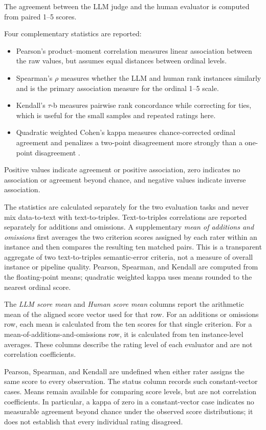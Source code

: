 The agreement between the LLM judge and the human evaluator is computed from
paired 1--5 scores.

Four complementary statistics are reported:
\begin{itemize}
  \item Pearson's product--moment correlation measures linear association
  between the raw values, but assumes equal distances between ordinal levels.
  \item Spearman's $\rho$ measures whether the LLM and human rank instances
  similarly and is the primary association measure for the ordinal 1--5 scale.
  \item Kendall's $\tau$-b measures pairwise rank concordance while correcting
  for ties, which is useful for the small samples and repeated ratings here.
  \item Quadratic weighted Cohen's kappa measures chance-corrected ordinal
  agreement and penalizes a two-point disagreement more strongly than a
  one-point disagreement \cite{cohen1960agreement}.
\end{itemize}
Positive values indicate agreement or positive association, zero indicates no
association or agreement beyond chance, and negative values indicate inverse
association.

The statistics are calculated separately for the two evaluation tasks and never
mix data-to-text with text-to-triples. Text-to-triples correlations are reported
separately for additions and omissions. A supplementary \emph{mean of additions
and omissions} first averages the two criterion scores assigned by each rater
within an instance and then compares the resulting ten matched pairs. This is a
transparent aggregate of two text-to-triples semantic-error criteria, not a
measure of overall instance or pipeline quality. Pearson, Spearman, and Kendall
are computed from the floating-point means; quadratic weighted kappa uses means
rounded to the nearest ordinal score.

The \emph{LLM score mean} and \emph{Human score mean} columns report the
arithmetic mean of the aligned score vector used for that row. For an additions
or omissions row, each mean is calculated from the ten scores for that single
criterion. For a mean-of-additions-and-omissions row, it is calculated from ten
instance-level averages. These columns describe the rating
level of each evaluator and are not correlation coefficients.

Pearson, Spearman, and Kendall are undefined when either rater assigns the same
score to every observation. The status column records such constant-vector
cases. Means remain available for comparing score levels, but are not
correlation coefficients. In particular, a kappa of zero in a constant-vector
case indicates no measurable agreement beyond chance under the observed score
distributions; it does not establish that every individual rating disagreed.

